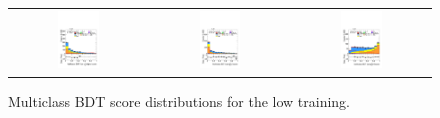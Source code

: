 \begin{figure}[htbp]
  \centering
  \setlength{\tabcolsep}{1.5pt}
  \renewcommand{\arraystretch}{0}
  \begin{tabular}{@{}c c c@{}}
    \includegraphics[width=0.32\textwidth]{images/plots_overtrain_lt200/plot_tth_signal_multiclass_lt200_hh_tth.pdf} &
    \includegraphics[width=0.32\textwidth]{images/plots_overtrain_lt200/plot_tth_Z_multiclass_lt200_hh_tth.pdf} &  
    \includegraphics[width=0.32\textwidth]{images/plots_overtrain_lt200/plot_tth_ttbar_multiclass_lt200_hh_tth.pdf}   
  \end{tabular}
  \caption{Multiclass BDT score distributions for the low \pth training.}
  \label{lowpt_modelling}
\end{figure}

